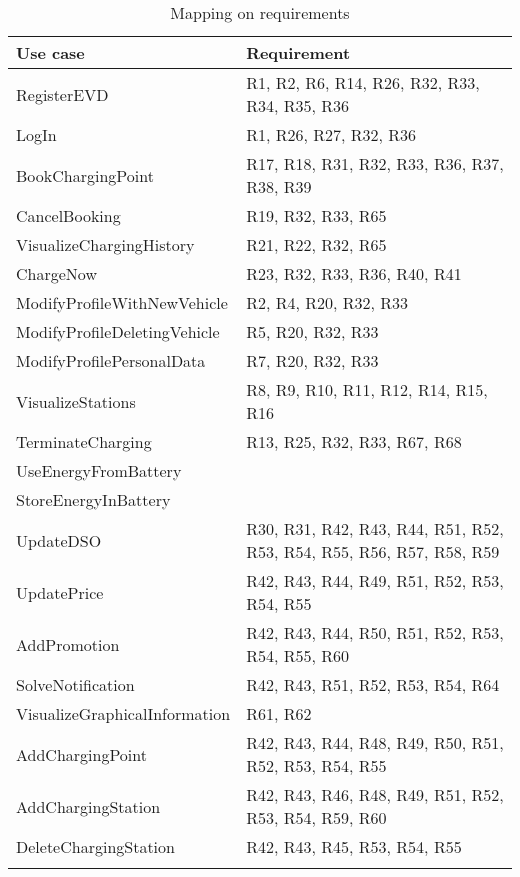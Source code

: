 \begin{center}
    \begin{longtable}[H]{|p{0.4\linewidth}|p{0.6\linewidth}|}
     \hline
     \textbf{Use case} & \textbf{Requirement}\\
     \hline
     RegisterEVD & R1, R2, R6, R14, R26, R32, R33, R34, R35, R36 \\
     \hline
     LogIn & R1, R26, R27, R32, R36 \\
     \hline
     BookChargingPoint & R17, R18, R31, R32, R33, R36, R37, R38, R39 \\
     \hline
     CancelBooking &  R19, R32, R33, R65 \\
     \hline
     VisualizeChargingHistory & R21, R22, R32, R65 \\
     \hline
     ChargeNow & R23, R32, R33, R36, R40, R41 \\
     \hline
     ModifyProfileWithNewVehicle & R2, R4, R20, R32, R33 \\
     \hline
     ModifyProfileDeletingVehicle & R5, R20, R32, R33 \\
     \hline
     ModifyProfilePersonalData & R7, R20, R32, R33 \\
     \hline
     VisualizeStations & R8, R9, R10, R11, R12, R14, R15, R16 \\
     \hline
     TerminateCharging & R13, R25, R32, R33, R67, R68\\
     \hline
     UseEnergyFromBattery & \\
     \hline
     StoreEnergyInBattery & \\
     \hline
     UpdateDSO & R30, R31, R42, R43, R44, R51, R52, R53, R54, R55, R56, R57, R58, R59 \\
     \hline
     UpdatePrice & R42, R43, R44, R49, R51, R52, R53, R54, R55\\
     \hline
     AddPromotion & R42, R43, R44, R50, R51, R52, R53, R54, R55, R60 \\
     \hline
     SolveNotification & R42, R43, R51, R52, R53, R54, R64\\
     \hline
     VisualizeGraphicalInformation & R61, R62 \\
     \hline
     AddChargingPoint & R42, R43, R44, R48, R49, R50, R51, R52, R53, R54, R55 \\
     \hline
     AddChargingStation & R42, R43, R46, R48, R49, R51, R52, R53, R54, R59, R60 \\
     \hline
     DeleteChargingStation & R42, R43, R45, R53, R54, R55 \\
     \hline
    \caption{Mapping on requirements}
    \label{tab:Mapping on requirements}
    \end{longtable}
\end{center}